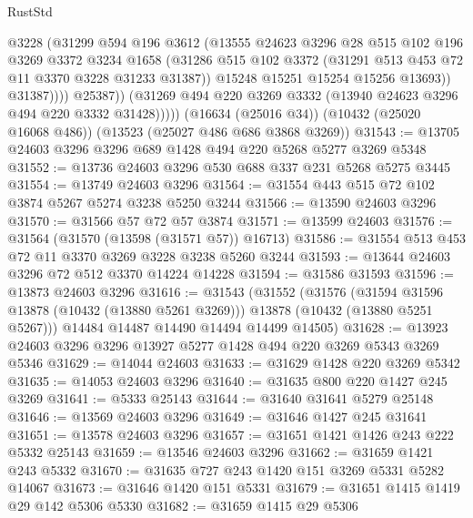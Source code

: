 \begin{lexlean}{RustStd}
\begin{coremodule}
                      @3228
                      (@31299
                        @594
                        @196
                        @3612
                        (@13555
                          @24623
                          @3296
                          @28
                          @515
                          @102
                          @196
                          @3269
                          @3372
                          @3234
                          @1658
                          (@31286
                            @515
                            @102
                            @3372
                            (@31291 @513 @453 @72 @11 @3370 @3228 @31233 @31387))
                          @15248
                          @15251
                          @15254
                          @15256
                          @13693))
                      @31387))))
              @25387))
          (@31269 @494 @220 @3269 @3332 (@13940 @24623 @3296 @494 @220 @3332 @31428)))))
    (@16634 (@25016 @34))
    (@10432 (@25020 @16068 @486))
    (@13523 (@25027 @486 @686 @3868 @3269))
@31543 := @13705 @24603 @3296 @3296 @689 @1428 @494 @220 @5268 @5277 @3269 @5348
@31552 := @13736 @24603 @3296 @530 @688 @337 @231 @5268 @5275 @3445
@31554 := @13749 @24603 @3296
@31564 := @31554 @443 @515 @72 @102 @3874 @5267 @5274 @3238 @5250 @3244
@31566 := @13590 @24603 @3296
@31570 := @31566 @57 @72 @57 @3874
@31571 := @13599 @24603
@31576 := @31564 (@31570 (@13598 (@31571 @57)) @16713)
@31586 := @31554 @513 @453 @72 @11 @3370 @3269 @3228 @3238 @5260 @3244
@31593 := @13644 @24603 @3296 @72 @512 @3370 @14224 @14228
@31594 := @31586 @31593
@31596 := @13873 @24603 @3296
@31616 := @31543
    (@31552
      (@31576
        (@31594 @31596 @13878 (@10432 (@13880 @5261 @3269)))
        @13878
        (@10432 (@13880 @5251 @5267)))
      @14484
      @14487
      @14490
      @14494
      @14499
      @14505)
@31628 := @13923 @24603 @3296 @3296 @13927 @5277 @1428 @494 @220 @3269 @5343 @3269 @5346
@31629 := @14044 @24603
@31633 := @31629 @1428 @220 @3269 @5342
@31635 := @14053 @24603 @3296
@31640 := @31635 @800 @220 @1427 @245 @3269
@31641 := @5333 @25143
@31644 := @31640 @31641 @5279 @25148
@31646 := @13569 @24603 @3296
@31649 := @31646 @1427 @245 @31641
@31651 := @13578 @24603 @3296
@31657 := @31651 @1421 @1426 @243 @222 @5332 @25143
@31659 := @13546 @24603 @3296
@31662 := @31659 @1421 @243 @5332
@31670 := @31635 @727 @243 @1420 @151 @3269 @5331 @5282 @14067
@31673 := @31646 @1420 @151 @5331
@31679 := @31651 @1415 @1419 @29 @142 @5306 @5330
@31682 := @31659 @1415 @29 @5306

\end{coremodule}
\end{lexlean}
